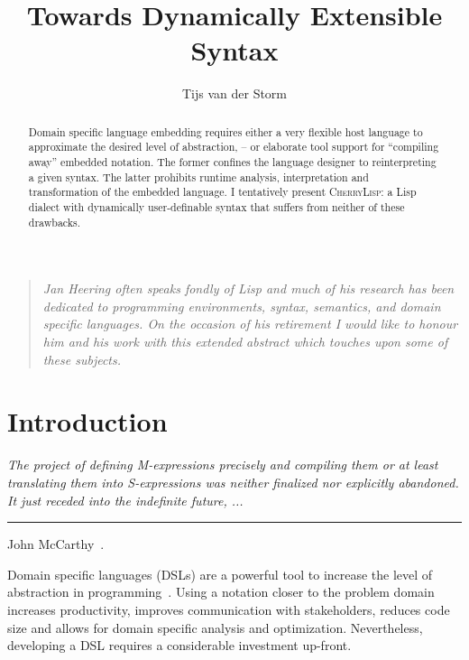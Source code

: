 \documentclass[a4paper]{llncs}
\title{Towards Dynamically Extensible Syntax}
\author{Tijs van der Storm}
\institute{Centrum Wiskunde \&\ Informatica\\
  Science Park 123\\
  1098 XG Amsterdam}
\def\cherrylisp{\textsc{CherryLisp}\xspace}
\begin{document}
\maketitle


\begin{abstract}
  Domain specific language embedding requires either a very flexible
  host language to approximate the desired level of abstraction, -- or
  elaborate tool support for ``compiling away'' embedded notation. The
  former confines the language designer to reinterpreting a given
  syntax. The latter prohibits runtime analysis, interpretation and
  transformation of the embedded language. I tentatively present
  \cherrylisp: a Lisp dialect with dynamically user-definable syntax
  that suffers from neither of these drawbacks.
\end{abstract}

\begin{quote}
  \textit{Jan Heering often speaks fondly of Lisp and much of his
    research has been dedicated to programming environments, syntax,
    semantics, and domain specific languages. On the occasion of his
    retirement I would like to honour him and his work with this
    extended abstract which touches upon some of these subjects.}
\end{quote}

\section{Introduction}
\label{SECT:introduction}

\hfill\begin{minipage}[t]{0.66\linewidth}
\begin{flushright}\small
  \textit{The project of defining M-expressions precisely and
    compiling them or at least translating them into S-expressions was
    neither finalized nor explicitly abandoned. It just receded into
    the indefinite future, ...}\\[0pt]
  \rule{1cm}{0pt} \hfill John McCarthy~\cite{HistoryOfLISP}.
\end{flushright}
\end{minipage}\bigskip

\noindent Domain specific languages (DSLs) are a powerful tool to
increase the level of abstraction in
programming~\cite{WhenAndHowDSL}. Using a notation closer to the
problem domain increases productivity, improves communication with
stakeholders, reduces code size and allows for domain specific
analysis and optimization. Nevertheless, developing a DSL requires a
considerable investment up-front. 
\end{document}
